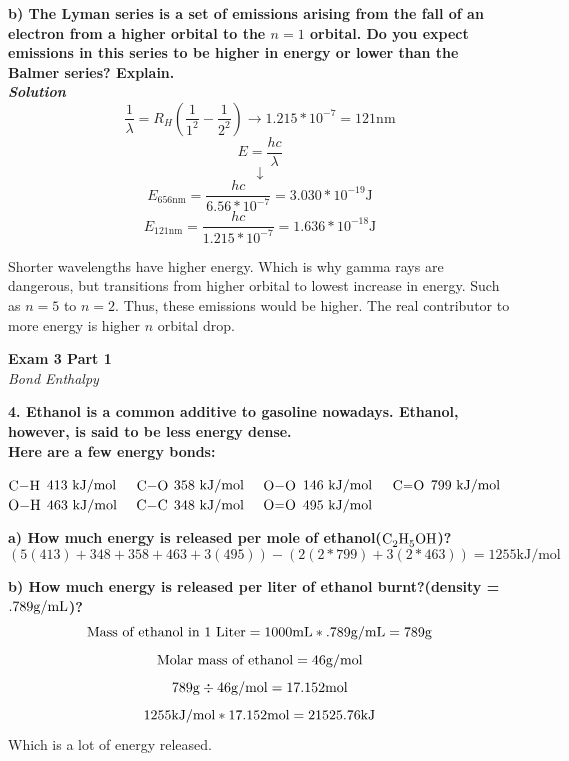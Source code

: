 \documentclass{article}
\begin{document}
    \textbf{b) The Lyman series is a set of emissions arising from the fall of an electron from a higher orbital to the $n = 1$ orbital. Do you expect emissions in this series to be higher in energy or lower than the Balmer series? Explain.}\\
    \textbf{\textit{Solution}}
    $$\dfrac{1}{\lambda} = R_{H}(\dfrac{1}{1^{2}} - \dfrac{1}{2^{2}}) \rightarrow 1.215 * 10^{-7} = 121 \si{\nano\meter}$$
    $$E = \dfrac{hc}{\lambda} $$
    $$ \downarrow $$
    $$E_{656 \si{\nano\meter}} = \dfrac{hc}{6.56 * 10^{-7}}  = 3.030 * 10^{-19} \si{\joule}$$
    $$E_{121 \si{\nano\meter}} = \dfrac{hc}{1.215 * 10^{-7}} = 1.636 * 10^{-18} \si{\joule}$$

    Shorter wavelengths have higher energy. Which is why gamma rays are dangerous, but transitions from higher orbital to lowest increase in energy. Such as $n=5$ to $n=2$. Thus, these emissions would be higher. The real contributor to more energy is higher $n$ orbital drop.

    \pagebreak

    \begin{center}
        \textbf{Exam 3 Part 1}\\
        \textit{Bond Enthalpy}
    \end{center}
    \textbf{4. Ethanol is a common additive to gasoline nowadays. Ethanol, however, is said to be less energy dense.\\ Here are a few energy bonds:}
    \begin{center}
        $\ce{C-H}$ $413 \  \si[per-mode=symbol]{\kilo\joule\per\mol} \quad$
        $\ce{C-O}$ $358 \ \si[per-mode=symbol]{\kilo\joule\per\mol} \quad$
        $\ce{O-O}$ $146 \  \si[per-mode=symbol]{\kilo\joule\per\mol} \quad$
        $\ce{C=O}$ $799 \  \si[per-mode=symbol]{\kilo\joule\per\mol}$\\[.2cm]
        $\ce{O-H}$ $463 \  \si[per-mode=symbol]{\kilo\joule\per\mol} \quad$
        $\ce{C-C}$ $348 \  \si[per-mode=symbol]{\kilo\joule\per\mol} \quad$
        $\ce{O=O}$ $495 \  \si[per-mode=symbol]{\kilo\joule\per\mol}$
    \end{center}

    \textbf{a) How much energy is released per mole of ethanol($\ce{C2H5OH}$)?}
    $$(5(413) + 348 + 358 + 463 + 3(495)) - (2(2*799) + 3(2*463))  = 1255 \si{\kilo\joule\per\mole}$$

    \textbf{b) How much energy is released per liter of ethanol burnt?(density = $.789 \si[per-mode=symbol]{\gram\per\milli\liter}$)?}
    $$\text{Mass of ethanol in 1 Liter}  = 1000 \si{\milli\liter} * .789 \si[per-mode=symbol]{\gram\per\milli\liter}  = 789 \si{\gram} $$
    $$\text{Molar mass of ethanol} = 46 \si[per-mode=symbol]{\gram\per\mole} $$
    $$789 \si{\gram} \div 46 \si[per-mode=symbol]{\gram\per\mole} = 17.152 \si{\mol}$$
    $$1255 \si[per-mode=symbol]{\kilo\joule\per\mole} * 17.152 \si{\mol}  = 21525.76 \si{\kilo\joule}$$
    Which is a lot of energy released.
    \pagebreak
\end{document}
